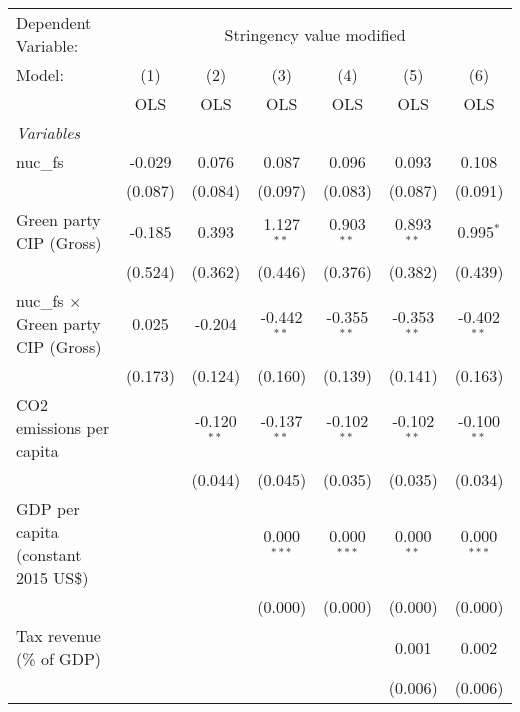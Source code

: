 
\begingroup
\centering
\begin{tabular}{lcccccc}
   \toprule
   Dependent Variable: & \multicolumn{6}{c}{Stringency value modified}\\
   Model:                                     & (1)     & (2)           & (3)           & (4)           & (5)           & (6)\\  
                                              &  OLS    & OLS           & OLS           & OLS           & OLS           & OLS\\  
   \midrule
   \emph{Variables}\\
   nuc\_fs                                    & -0.029  & 0.076         & 0.087         & 0.096         & 0.093         & 0.108\\   
                                              & (0.087) & (0.084)       & (0.097)       & (0.083)       & (0.087)       & (0.091)\\   
   Green party CIP (Gross)                    & -0.185  & 0.393         & 1.127$^{**}$  & 0.903$^{**}$  & 0.893$^{**}$  & 0.995$^{*}$\\   
                                              & (0.524) & (0.362)       & (0.446)       & (0.376)       & (0.382)       & (0.439)\\   
   nuc\_fs $\times$ Green party CIP (Gross)   & 0.025   & -0.204        & -0.442$^{**}$ & -0.355$^{**}$ & -0.353$^{**}$ & -0.402$^{**}$\\   
                                              & (0.173) & (0.124)       & (0.160)       & (0.139)       & (0.141)       & (0.163)\\   
   CO2 emissions per capita                   &         & -0.120$^{**}$ & -0.137$^{**}$ & -0.102$^{**}$ & -0.102$^{**}$ & -0.100$^{**}$\\   
                                              &         & (0.044)       & (0.045)       & (0.035)       & (0.035)       & (0.034)\\   
   GDP per capita (constant 2015 US\$)        &         &               & 0.000$^{***}$ & 0.000$^{***}$ & 0.000$^{**}$  & 0.000$^{***}$\\   
                                              &         &               & (0.000)       & (0.000)       & (0.000)       & (0.000)\\   
   Tax revenue (\% of GDP)                    &         &               &               &               & 0.001         & 0.002\\   
                                              &         &               &               &               & (0.006)       & (0.006)\\   

\end{tabular}
